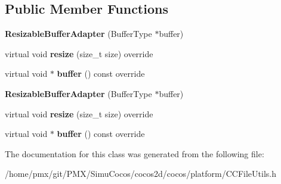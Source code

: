 \subsection*{Public Member Functions}
\begin{DoxyCompactItemize}
\item 
\mbox{\label{classResizableBufferAdapter_3_01std_1_1basic__string_3_01CharT_00_01Traits_00_01Allocator_01_4_01_4_af072e495513eee82bae79b833b356653}} 
{\bfseries Resizable\+Buffer\+Adapter} (Buffer\+Type $\ast$buffer)
\item 
\mbox{\label{classResizableBufferAdapter_3_01std_1_1basic__string_3_01CharT_00_01Traits_00_01Allocator_01_4_01_4_aa04b4943141fe4a45deb7e8c7e63d169}} 
virtual void {\bfseries resize} (size\+\_\+t size) override
\item 
\mbox{\label{classResizableBufferAdapter_3_01std_1_1basic__string_3_01CharT_00_01Traits_00_01Allocator_01_4_01_4_adaea9a5d5b44ccdec999a8d2034331e3}} 
virtual void $\ast$ {\bfseries buffer} () const override
\item 
\mbox{\label{classResizableBufferAdapter_3_01std_1_1basic__string_3_01CharT_00_01Traits_00_01Allocator_01_4_01_4_af072e495513eee82bae79b833b356653}} 
{\bfseries Resizable\+Buffer\+Adapter} (Buffer\+Type $\ast$buffer)
\item 
\mbox{\label{classResizableBufferAdapter_3_01std_1_1basic__string_3_01CharT_00_01Traits_00_01Allocator_01_4_01_4_aa04b4943141fe4a45deb7e8c7e63d169}} 
virtual void {\bfseries resize} (size\+\_\+t size) override
\item 
\mbox{\label{classResizableBufferAdapter_3_01std_1_1basic__string_3_01CharT_00_01Traits_00_01Allocator_01_4_01_4_adaea9a5d5b44ccdec999a8d2034331e3}} 
virtual void $\ast$ {\bfseries buffer} () const override
\end{DoxyCompactItemize}


The documentation for this class was generated from the following file\+:\begin{DoxyCompactItemize}
\item 
/home/pmx/git/\+P\+M\+X/\+Simu\+Cocos/cocos2d/cocos/platform/C\+C\+File\+Utils.\+h\end{DoxyCompactItemize}
